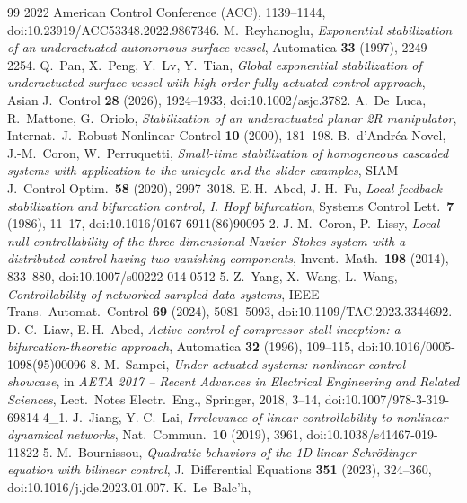 \documentclass[11pt,reqno]{amsart}
\theoremstyle{plain}
\theoremstyle{remark}
\theoremstyle{definition}
\begin{document}
{\begin{thebibliography}{99}
  2022 American Control Conference (ACC), 1139--1144, doi:10.23919/ACC53348.2022.9867346.
 M.~Reyhanoglu,
  \emph{Exponential stabilization of an underactuated autonomous surface vessel},
  Automatica \textbf{33} (1997), 2249--2254.
 Q.~Pan, X.~Peng, Y.~Lv, Y.~Tian,
  \emph{Global exponential stabilization of underactuated surface vessel with high-order fully actuated
  control approach}, Asian J.\ Control \textbf{28} (2026), 1924--1933, doi:10.1002/asjc.3782.
 A.~De~Luca, R.~Mattone, G.~Oriolo,
  \emph{Stabilization of an underactuated planar 2R manipulator},
  Internat.\ J.\ Robust Nonlinear Control \textbf{10} (2000), 181--198.
 B.~d'Andr\'ea-Novel, J.-M.~Coron, W.~Perruquetti,
  \emph{Small-time stabilization of homogeneous cascaded systems with application to the unicycle
  and the slider examples}, SIAM J.\ Control Optim.\ \textbf{58} (2020), 2997--3018.
 E.\,H.~Abed, J.-H.~Fu,
  \emph{Local feedback stabilization and bifurcation control, I. Hopf
  bifurcation}, Systems Control Lett.\ \textbf{7} (1986), 11--17, doi:10.1016/0167-6911(86)90095-2.
 J.-M.~Coron, P.~Lissy,
  \emph{Local null controllability of the three-dimensional Navier--Stokes system with a distributed control
  having two vanishing components}, Invent.\ Math.\ \textbf{198} (2014), 833--880, doi:10.1007/s00222-014-0512-5.
 Z.~Yang, X.~Wang, L.~Wang,
  \emph{Controllability of networked sampled-data systems}, IEEE Trans.\ Automat.\ Control \textbf{69} (2024),
  5081--5093, doi:10.1109/TAC.2023.3344692.
 D.-C.~Liaw, E.\,H.~Abed,
  \emph{Active control of compressor stall inception: a bifurcation-theoretic approach}, Automatica \textbf{32}
  (1996), 109--115, doi:10.1016/0005-1098(95)00096-8.
 M.~Sampei,
  \emph{Under-actuated systems: nonlinear control showcase}, in \emph{AETA 2017 -- Recent Advances in Electrical
  Engineering and Related Sciences}, Lect.\ Notes Electr.\ Eng., Springer, 2018, 3--14,
  doi:10.1007/978-3-319-69814-4\_1.
 J.~Jiang, Y.-C.~Lai,
  \emph{Irrelevance of linear controllability to nonlinear dynamical networks}, Nat.\ Commun.\ \textbf{10} (2019),
  3961, doi:10.1038/s41467-019-11822-5.
 M.~Bournissou,
  \emph{Quadratic behaviors of the 1D linear Schr\"odinger equation with bilinear control}, J.\ Differential
  Equations \textbf{351} (2023), 324--360, doi:10.1016/j.jde.2023.01.007.
 K.~Le~Balc'h,

\end{thebibliography}}
\end{document}
